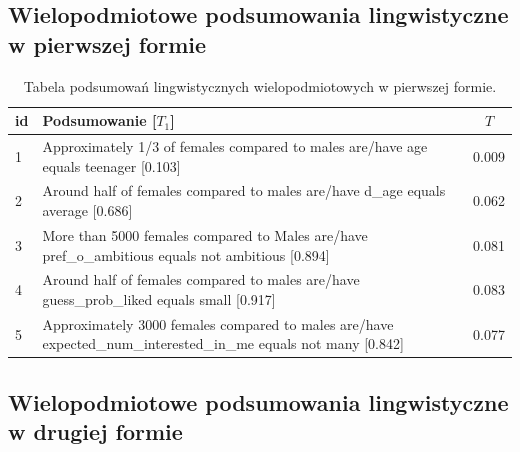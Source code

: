 \documentclass{classrep}
\begin{document}
\subsection{Wielopodmiotowe podsumowania lingwistyczne w pierwszej formie}

\begin{center}
  \begin{table}[H]
    \begin{tabularx}{\textwidth}{lXc}
    
    id & Podsumowanie [$T_1$] & $T$ \\ \hline 
  
    1 & Approximately 1/3 of females compared to males are/have age equals teenager [0.103] &  0.009 \\\hline
    2 & Around half of females compared to males are/have d\_age equals average [0.686] & 0.062 \\  \hline
    3 & More than 5000 females compared to Males are/have pref\_o\_ambitious equals not ambitious [0.894] & 0.081 \\ \hline
    4 & Around half of females compared to males are/have guess\_prob\_liked equals small [0.917] & 0.083\\ \hline
    5 & Approximately 3000 females compared to males are/have expected\_num\_interested\_in\_me equals not many [0.842] &0.077 \\ \hline
  \end{tabularx}
  \caption{Tabela podsumowań lingwistycznych wielopodmiotowych w pierwszej formie.}
\end{table}
\end{center}

\subsection{Wielopodmiotowe podsumowania lingwistyczne w drugiej formie}
\end{document}

